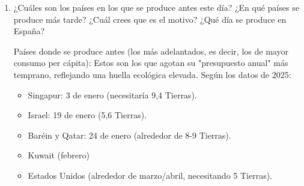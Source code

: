 {\begin{enumerate}[label=\alph*)]
\begin{solution}
\begin{itemize}[label=$\bullet$]
\end{itemize}
 Desde 1970, esta fecha ha avanzado más de 5 meses (de finales de diciembre a julio), impulsada por
el crecimiento económico y demográfico sin avances proporcionales en eficiencia.
\end{solution}
\newpage
\vspace{1em}
\begin{solution}
{}
\(\boxed{\text{Principales consecuencias:}}\)
\vspace{1em}

\begin{itemize}[label=$\bullet$]
	\item{ Equivale a 22 años de la productividad total de la Tierra; si continuamos así, crecerá 0,8 ``planetas'' por año.}
	\item{ Deforestación, erosión del suelo, pérdida de biodiversidad y acumulación de CO$_2$ en la atmósfera (aumento de 100 ppm desde el inicio del sobregiro global en 1971)}
	\item{ Aumento de eventos climáticos extremos (olas de calor, inundaciones), declive en la producción de alimentos, escasez de agua y riesgos para la seguridad alimentaria.}
	
\end{itemize}

\end{solution}
\vspace{2em}

	\item{¿Cuáles son los países en los que se produce antes este día? ¿En qué países se produce más tarde? ¿Cuál crees que es el motivo? ¿Qué día se produce en España?}
\begin{solution}
Países donde se produce antes (los más adelantados, es decir, los de mayor consumo per cápita):
Estos son los que agotan su "presupuesto anual" más temprano, reflejando una huella ecológica elevada. Según los datos de 2025:
\begin{itemize}[label=$\bullet$]
	\item{Singapur: 3 de enero (necesitaría 9,4 Tierras).}
	\item{Israel: 19 de enero (5,6 Tierras).}
	\item{Baréin y Qatar: 24 de enero (alrededor de 8-9 Tierras).}
	\item{Kuwait (febrero)}
	\item{Estados Unidos (alrededor de marzo/abril, necesitando 5 Tierras).}
\end{itemize}


\end{solution}
\end{enumerate}}
